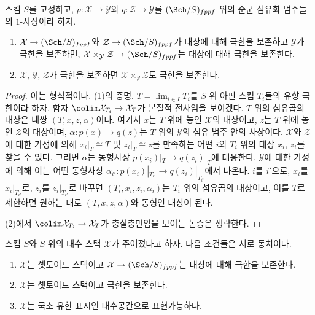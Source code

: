 \begin{lemma}
\label{lemma-fibre-product-limit-preserving}
스킴 $S$를 고정하고, $p : \mathcal{X} \to \mathcal{Y}$와
$q : \mathcal{Z} \to \mathcal{Y}$를 $(\Sch/S)_{fppf}$ 위의
준군 섬유화 범주들의 $1$-사상이라 하자.
\begin{enumerate}
\item $\mathcal{X} \to (\Sch/S)_{fppf}$와
$\mathcal{Z} \to (\Sch/S)_{fppf}$가 대상에 대해 극한을 보존하고
$\mathcal{Y}$가 극한을 보존하면,
$\mathcal{X} \times_\mathcal{Y} \mathcal{Z} \to (\Sch/S)_{fppf}$는
대상에 대해 극한을 보존한다.
\item $\mathcal{X}$, $\mathcal{Y}$, $\mathcal{Z}$가 극한을 보존하면
$\mathcal{X} \times_\mathcal{Y} \mathcal{Z}$도 극한을 보존한다.
\end{enumerate}
\end{lemma}

\begin{proof}
이는 형식적이다. (1)의 증명. $T = \lim_{i \in I} T_i$를 $S$ 위 아핀
스킴 $T_i$들의 유향 극한이라 하자. 함자
$\colim \mathcal{X}_{T_i} \to \mathcal{X}_T$가 본질적 전사임을 보이겠다.
$T$ 위의 섬유곱의 대상은 네쌍 $(T, x, z, \alpha)$이다. 여기서 $x$는
$T$ 위에 놓인 $\mathcal{X}$의 대상이고, $z$는 $T$ 위에 놓인
$\mathcal{Z}$의 대상이며, $\alpha : p(x) \to q(z)$는 $T$ 위의
$\mathcal{Y}$의 섬유 범주 안의 사상이다. $\mathcal{X}$와
$\mathcal{Z}$에 대한 가정에 의해 $x_i|_T \cong T$ 및
$z_i|_T \cong z$를 만족하는 어떤 $i$와 $T_i$ 위의 대상 $x_i$, $z_i$를
찾을 수 있다.
그러면 $\alpha$는 동형사상 $p(x_i)|_T \to q(z_i)|_T$에 대응한다.
$\mathcal{Y}$에 대한 가정에 의해 이는 어떤 동형사상
$\alpha_{i'} : p(x_i)|_{T_{i'}} \to q(z_i)|_{T_{i'}}$에서 나온다.
$i$를 $i'$으로, $x_i$를 $x_i|_{T_{i'}}$로, $z_i$를
$z_i|_{T_{i'}}$로 바꾸면 $(T_i, x_i, z_i, \alpha_i)$는 $T_i$ 위의
섬유곱의 대상이고, 이를 $T$로 제한하면 원하는 대로
$(T, x, z, \alpha)$와 동형인 대상이 된다.

\medskip\noindent
(2)에서 $\colim \mathcal{X}_{T_i} \to \mathcal{X}_T$가 충실충만임을
보이는 논증은 생략한다.
\end{proof}

\begin{lemma}
\label{lemma-limit-preserving-algebraic-space}
스킴 $S$와 $S$ 위의 대수 스택 $\mathcal{X}$가 주어졌다고 하자.
다음 조건들은 서로 동치이다.
\begin{enumerate}
\item $\mathcal{X}$는 셋토이드 스택이고
$\mathcal{X} \to (\Sch/S)_{fppf}$는 대상에 대해 극한을 보존한다.
\item $\mathcal{X}$는 셋토이드 스택이고 극한을 보존한다.
\item $\mathcal{X}$는 국소 유한 표시인 대수공간으로 표현가능하다.
\end{enumerate}
\end{lemma}

